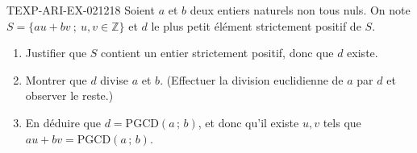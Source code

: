 \begin{exercice}{TEXP-ARI-EX-021}{2}{18}
Soient $a$ et $b$ deux entiers naturels non tous nuls. On note
$S=\{au+bv\ ;\ u,v\in\mathbb{Z}\}$ et $d$ le plus petit élément strictement
positif de $S$.
\begin{enumerate}
  \item Justifier que $S$ contient un entier strictement positif, donc que $d$
        existe.
  \item Montrer que $d$ divise $a$ et $b$. (Effectuer la division euclidienne
        de $a$ par $d$ et observer le reste.)
  \item En déduire que $d=\mathrm{PGCD}(a\,;\,b)$, et donc qu'il existe $u,v$
        tels que $au+bv=\mathrm{PGCD}(a\,;\,b)$.
\end{enumerate}
\end{exercice}
